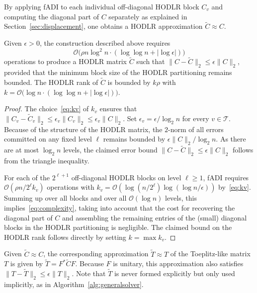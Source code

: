 \documentclass[final,reqno,onefignum,onetabnum]{siamart190516}
\begin{document}
By applying fADI to each individual off-diagonal HODLR block $C_v$
and computing the diagonal part of $C$ separately as explained in Section~\ref{sec:displacement}, one obtains 
a HODLR approximation $\widetilde{C} \approx C$.
\begin{corollary} 
Given $\epsilon > 0$, the construction described above requires 
\begin{equation} \label{eq:complexity}
 \mathcal O\big( \rho n \log^2\!n \cdot (\log \log n + |\log \epsilon| ) \big)
\end{equation}
operations to produce a HODLR matrix $\widetilde{C}$ 
such that $\| C- \widetilde{C}\|_2 \le
\epsilon \| C\|_2$, provided that the minimum block size of the HODLR partitioning remains bounded. The HODLR rank of 
$\widetilde{C}$ is bounded by $k\rho$ with $k = \mathcal O\big( \log n \cdot (\log \log n + |\log \epsilon| ) \big)$.

\end{corollary}
\begin{proof} The choice~\eqref{eq:kv} of $k_v$ ensures that $\|C_v - \widetilde{C}_v\|_2 \le \epsilon_v \|C_v\|_2 \le \epsilon_v \|C\|_2$. Set 
$
\epsilon_{v} = \epsilon / \log_2 n
$
for every $v \in \mathcal T$.
Because of the structure of the HODLR matrix, the $2$-norm of all errors committed on any fixed level $\ell$ remains bounded by $\epsilon \|C\|_2 / \log_2 n $. As there are at most $\log_2 n$ levels, the claimed error bound 
$\| C- \widetilde{C}\|_2 \le
\epsilon \| C\|_2$ follows from the triangle inequality.

For each of the $2^{\ell+1}$ off-diagonal HODLR blocks on level $\ell \ge 1$, fADI requires $\mathcal O(\rho n/2^\ell k_v)$ operations with $k_v = \mathcal O( \log(n/2^\ell) \log(\log n / \epsilon) )$ by~\eqref{eq:kv}. Summing up over all blocks and over all $\mathcal O(\log n)$ levels, this implies~\eqref{eq:complexity},
taking into account that the cost for recovering the diagonal part of $C$ and assembling the remaining entries of the (small) diagonal blocks in the HODLR partitioning is negligible.
The claimed bound on the HODLR rank follows directly by setting $k = \max k_{v}$.
\end{proof}

Given $\widetilde{C} \approx C$, the corresponding approximation $\widetilde T \approx T$ of the 
Toeplitz-like matrix $T$ is given by $\widetilde T = F^* \widetilde{C} F$.
Because $F$ is unitary, this approximation also satisfies $\| T- \widetilde{T}\|_2 \le
\epsilon \| T\|_2$.
Note that $\widetilde T$ is never formed explicitly but only used implicitly, as in Algorithm~\ref{alg:generalsolver}.
\end{document}
